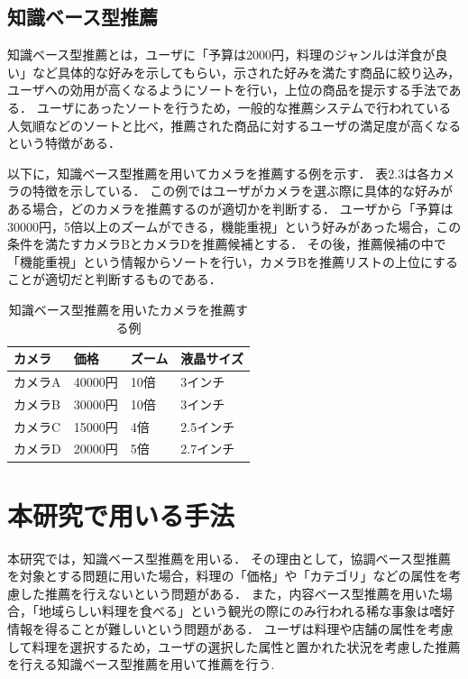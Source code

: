 \documentclass{funthesis}
\begin{document}
\subsection{知識ベース型推薦}
知識ベース型推薦とは，ユーザに「予算は2000円，料理のジャンルは洋食が良い」など具体的な好みを示してもらい，示された好みを満たす商品に絞り込み，
ユーザへの効用が高くなるようにソートを行い，上位の商品を提示する手法である．
ユーザにあったソートを行うため，一般的な推薦システムで行われている人気順などのソートと比べ，推薦された商品に対するユーザの満足度が高くなるという特徴がある．

以下に，知識ベース型推薦を用いてカメラを推薦する例を示す．
表2.3は各カメラの特徴を示している．
この例ではユーザがカメラを選ぶ際に具体的な好みがある場合，どのカメラを推薦するのが適切かを判断する．
ユーザから「予算は30000円，5倍以上のズームができる，機能重視」という好みがあった場合，この条件を満たすカメラBとカメラDを推薦候補とする．
その後，推薦候補の中で「機能重視」という情報からソートを行い，カメラBを推薦リストの上位にすることが適切だと判断するものである．

\begin{table}[htb]
  \begin{center}
  \scriptsize
    \caption{知識ベース型推薦を用いたカメラを推薦する例}
    \normalsize
   \begin{tabular}{p{3.3cm}||p{3.3cm}|p{3.3cm}|p{3.3cm}}
    \hline
カメラ & 価格 & ズーム & 液晶サイズ \\ \hline\hline
      カメラA & 40000円 & 10倍 & 3インチ \\ \hline
      カメラB & 30000円 & 10倍 & 3インチ \\ \hline
      カメラC & 15000円 & 4倍 & 2.5インチ \\ \hline
      カメラD & 20000円 & 5倍 & 2.7インチ \\ \hline
  \end{tabular}
  \end{center}
\end{table}

\section{本研究で用いる手法}
本研究では，知識ベース型推薦を用いる．
その理由として，協調ベース型推薦を対象とする問題に用いた場合，料理の「価格」や「カテゴリ」などの属性を考慮した推薦を行えないという問題がある．
また，内容ベース型推薦を用いた場合，「地域らしい料理を食べる」という観光の際にのみ行われる稀な事象は嗜好情報を得ることが難しいという問題がある．
ユーザは料理や店舗の属性を考慮して料理を選択するため，ユーザの選択した属性と置かれた状況を考慮した推薦を行える知識ベース型推薦を用いて推薦を行う.
\end{document}
